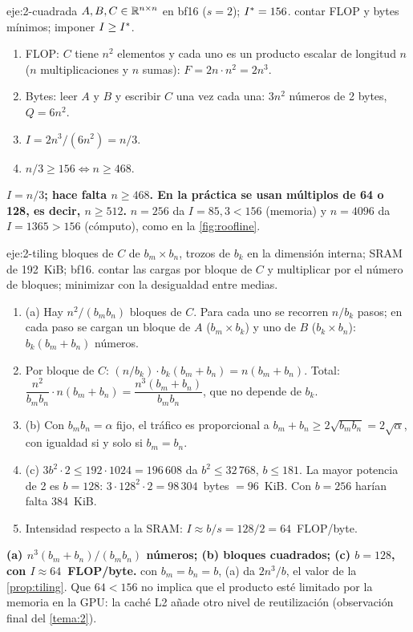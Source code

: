 \begin{solucion}{eje:2-cuadrada}
\datos $A,B,C\in\mathbb{R}^{n\times n}$ en bf16 ($s=2$); $I^{\ast}=156$.
\planteamiento contar FLOP y bytes mínimos; imponer $I\ge I^{\ast}$.
\pasos
\begin{enumerate}[label=\arabic*.]
  \item FLOP: $C$ tiene $n^{2}$ elementos y cada uno es un producto escalar de longitud $n$ ($n$ multiplicaciones y $n$ sumas): $F=2n\cdot n^{2}=2n^{3}$.
  \item Bytes: leer $A$ y $B$ y escribir $C$ una vez cada una: $3n^{2}$ números de 2 bytes, $Q=6n^{2}$.
  \item $I=2n^{3}/(6n^{2})=n/3$.
  \item $n/3\ge 156\iff n\ge 468$. \qedhere
\end{enumerate}
\resultado \textbf{$I=n/3$; hace falta $n\ge 468$. En la práctica se usan múltiplos de 64 o 128, es decir, $n\ge 512$.}
\comprobacion $n=256$ da $I=85{,}3<156$ (memoria) y $n=4096$ da $I=1365>156$ (cómputo), como en la \cref{fig:roofline}.
\end{solucion}

\begin{solucion}{eje:2-tiling}
\datos bloques de $C$ de $b_m\times b_n$, trozos de $b_k$ en la dimensión interna; SRAM de 192~KiB; bf16.
\planteamiento contar las cargas por bloque de $C$ y multiplicar por el número de bloques; minimizar con la desigualdad entre medias.
\pasos
\begin{enumerate}[label=\arabic*.]
  \item (a) Hay $n^{2}/(b_mb_n)$ bloques de $C$. Para cada uno se recorren $n/b_k$ pasos; en cada paso se cargan un bloque de $A$ ($b_m\times b_k$) y uno de $B$ ($b_k\times b_n$): $b_k(b_m+b_n)$ números.
  \item Por bloque de $C$: $(n/b_k)\cdot b_k(b_m+b_n)=n(b_m+b_n)$. Total: $\dfrac{n^{2}}{b_mb_n}\cdot n(b_m+b_n)=\dfrac{n^{3}(b_m+b_n)}{b_mb_n}$, que no depende de $b_k$.
  \item (b) Con $b_mb_n=\alpha$ fijo, el tráfico es proporcional a $b_m+b_n\ge 2\sqrt{b_mb_n}=2\sqrt{\alpha}$, con igualdad si y solo si $b_m=b_n$.
  \item (c) $3b^{2}\cdot 2\le 192\cdot 1024=196\,608$ da $b^{2}\le 32\,768$, $b\le 181$. La mayor potencia de 2 es $b=128$: $3\cdot 128^{2}\cdot 2=98\,304$~bytes $=96$~KiB. Con $b=256$ harían falta 384~KiB.
  \item Intensidad respecto a la SRAM: $I\approx b/s=128/2=64$~FLOP/byte.
\end{enumerate}
\resultado \textbf{(a) $n^{3}(b_m+b_n)/(b_mb_n)$ números; (b) bloques cuadrados; (c) $b=128$, con $I\approx 64$~FLOP/byte.}
\comprobacion con $b_m=b_n=b$, (a) da $2n^{3}/b$, el valor de la \cref{prop:tiling}. Que $64<156$ no implica que el producto esté limitado por la memoria en la GPU: la caché L2 añade otro nivel de reutilización (observación final del \cref{tema:2}).
\end{solucion}

